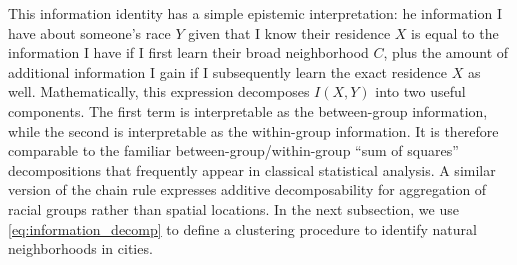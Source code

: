 	This information identity has a simple epistemic interpretation: he information I have about someone's race $Y$ given that I know their residence $X$ is equal to the information I have if I first learn their broad neighborhood $C$, plus the amount of additional information I gain if I subsequently learn the exact residence $X$ as well. Mathematically, this expression decomposes $I(X,Y)$ into two useful components. The first term is interpretable as the between-group information, while the second is interpretable as the within-group information. It is therefore comparable to the familiar between-group/within-group ``sum of squares'' decompositions that frequently appear in classical statistical analysis. A similar version of the chain rule expresses additive decomposability for aggregation of racial groups rather than spatial locations. In the next subsection, we use \eqref{eq:information_decomp} to define a clustering procedure to identify natural neighborhoods in cities. 

